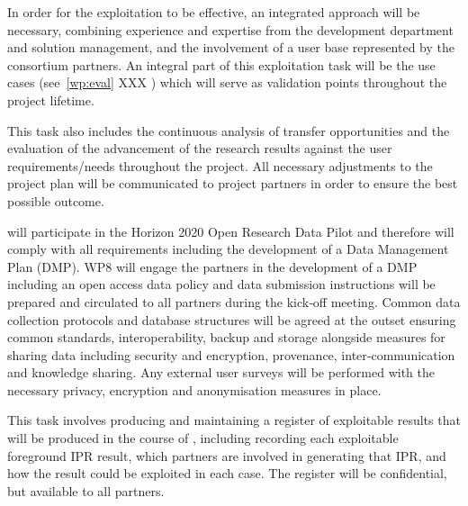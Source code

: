 \begin{Workpackage}{\thewpno}
\begin{Task}
In order for the exploitation to be effective, an integrated approach will be necessary, combining experience and expertise from the development department and solution management, and the involvement of a user base represented by the consortium partners.
An integral part of this exploitation task will be the \TheProject{} use cases (see~\ref{wp:eval} XXX ) which will serve as validation points throughout the project lifetime.

This task also includes the continuous analysis of transfer opportunities and the evaluation of the advancement of the research results against the user requirements/needs throughout the project.
All necessary adjustments to the project plan will be communicated to project partners  in order to ensure the best possible outcome.

\TheProject{} will participate in the Horizon 2020 Open Research Data Pilot and therefore will comply with all
requirements including the development of a Data Management Plan (DMP). WP8 will engage the \TheProject{}
partners in the development of a DMP including an open access data policy and data submission instructions will
be prepared and circulated to all partners during the kick‐off meeting. Common data collection protocols and database structures will be agreed at the outset ensuring common
standards, interoperability, backup and storage alongside measures for sharing data including security and
encryption, provenance, inter‐communication and knowledge sharing. Any external user surveys will be performed
with the necessary privacy, encryption and anonymisation measures in place.
\end{Task}

\begin{Task}


\TaskResults{%
\ref{del:dissemplan1};
\ref{del:dissemplan2}
}
\TaskHeader{}

This task involves producing and maintaining a register of exploitable results that will be produced in the course of \TheProject{}, including recording each exploitable foreground IPR result, which partners are involved in generating that IPR, and how the result could be exploited in each case.
The register will be confidential, but available to all partners.
\end{Task}

\begin{Task}


\end{Task}
\end{Workpackage}
